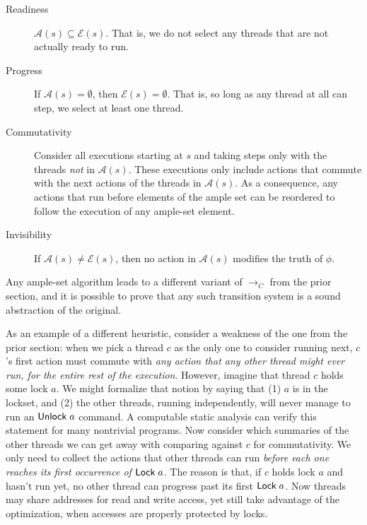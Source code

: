 \documentclass{amsbook}
\theoremstyle{definition}
\theoremstyle{remark}
\numberwithin{section}{chapter}
\numberwithin{equation}{chapter}
\begin{document}
\begin{description}
  \item[Readiness] $\mathcal A(s) \subseteq \mathcal E(s)$.  That is, we do not select any threads that are not actually ready to run.
  \item[Progress] If $\mathcal A(s) = \emptyset$, then $\mathcal E(s) = \emptyset$.  That is, so long as any thread at all can step, we select at least one thread.
  \item[Commutativity] Consider all executions starting at $s$ and taking steps only with the threads \emph{not} in $\mathcal A(s)$.  These executions only include actions that commute with the next actions of the threads in $\mathcal A(s)$.  As a consequence, any actions that run before elements of the ample set can be reordered to follow the execution of any ample-set element.
  \item[Invisibility] If $\mathcal A(s) \neq \mathcal E(s)$, then no action in $\mathcal A(s)$ modifies the truth of $\phi$.
\end{description}

Any ample-set algorithm leads to a different variant of $\to_C$ from the prior section, and it is possible to prove that any such transition system is a sound abstraction of the original.

As an example of a different heuristic, consider a weakness of the one from the prior section: when we pick a thread $c$ as the only one to consider running next, $c$'s first action must commute with \emph{any action that any other thread might ever run, for the entire rest of the execution}.
However, imagine that thread $c$ holds some lock $a$.
We might formalize that notion by saying that (1) $a$ is in the lockset, and (2) the other threads, running independently, will never manage to run an $\mathsf{Unlock} \; a$ command.
A computable static analysis can verify this statement for many nontrivial programs.
Now consider which summaries of the other threads we can get away with comparing against $c$ for commutativity.
We only need to collect the actions that other threads can run \emph{before each one reaches its first occurrence of $\mathsf{Lock} \; a$}.
The reason is that, if $c$ holds lock $a$ and hasn't run yet, no other thread can progress past its first $\mathsf{Lock} \; a$.
Now threads may share addresses for read and write access, yet still take advantage of the optimization, when accesses are properly protected by locks.
\end{document}
